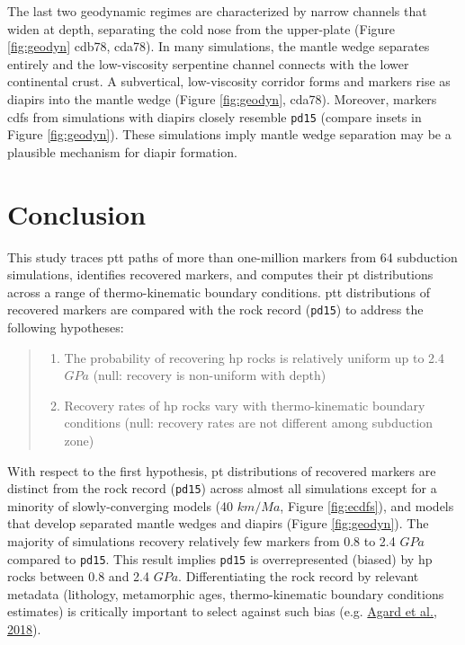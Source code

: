 The last two geodynamic regimes are characterized by narrow channels that widen at depth, separating the cold nose from the upper-plate (Figure \ref{fig:geodyn} cdb78, cda78). In many simulations, the mantle wedge separates entirely and the low-viscosity serpentine channel connects with the lower continental crust. A subvertical, low-viscosity corridor forms and markers rise as diapirs into the mantle wedge (Figure \ref{fig:geodyn}, cda78). Moreover, markers \glspl{cdf} from simulations with diapirs closely resemble \texttt{pd15} (compare insets in Figure \ref{fig:geodyn}). These simulations imply mantle wedge separation may be a plausible mechanism for diapir formation.

\hypertarget{chpt4Conclusions}{%
\section{Conclusion}\label{chpt4Conclusions}}

This study traces \gls{ptt} paths of more than one-million markers from 64 subduction simulations, identifies recovered markers, and computes their \gls{pt} distributions across a range of thermo-kinematic boundary conditions. \gls{ptt} distributions of recovered markers are compared with the rock record (\texttt{pd15}) to address the following hypotheses:

\begin{quote}
\begin{enumerate}
\def\labelenumi{\arabic{enumi}.}
\item
  The probability of recovering \gls{hp} rocks is relatively uniform up to 2.4 \(GPa\) (null: recovery is non-uniform with depth)
\item
  Recovery rates of \gls{hp} rocks vary with thermo-kinematic boundary conditions (null: recovery rates are not different among subduction zone)
\end{enumerate}
\end{quote}

With respect to the first hypothesis, \gls{pt} distributions of recovered markers are distinct from the rock record (\texttt{pd15}) across almost all simulations except for a minority of slowly-converging models (40 \(km/Ma\), Figure \ref{fig:ecdfs}), and models that develop separated mantle wedges and diapirs (Figure \ref{fig:geodyn}). The majority of simulations recovery relatively few markers from 0.8 to 2.4 \(GPa\) compared to \texttt{pd15}. This result implies \texttt{pd15} is overrepresented (biased) by \gls{hp} rocks between 0.8 and 2.4 \(GPa\). Differentiating the rock record by relevant metadata (lithology, metamorphic ages, thermo-kinematic boundary conditions estimates) is critically important to select against such bias (e.g. \protect\hyperlink{ref-agard2018}{Agard et al., 2018}).

